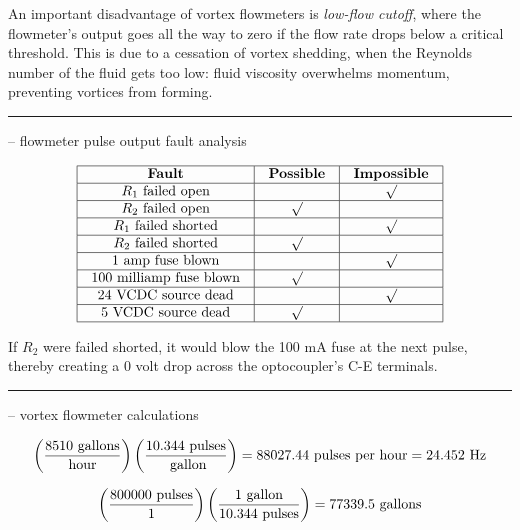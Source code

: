 \vskip 10pt

An important disadvantage of vortex flowmeters is {\it low-flow cutoff}, where the flowmeter's output goes all the way to zero if the flow rate drops below a critical threshold.  This is due to a cessation of vortex shedding, when the Reynolds number of the fluid gets too low: fluid viscosity overwhelms momentum, preventing vortices from forming.


\filbreak \vskip 5pt \hrule \vskip 5pt  -- flowmeter pulse output fault analysis \vskip 10pt


$$\vbox{\offinterlineskip
\halign{\strut
\vrule \quad\hfil # \ \hfil & 
\vrule \quad\hfil # \ \hfil & 
\vrule \quad\hfil # \ \hfil \vrule \cr
\noalign{\hrule}
%
{\bf Fault} & {\bf Possible} & {\bf Impossible} \cr
%
\noalign{\hrule}
%
$R_1$ failed open &  & $\surd$ \cr
%
\noalign{\hrule}
%
$R_2$ failed open & $\surd$ &  \cr
%
\noalign{\hrule}
%
$R_1$ failed shorted &  & $\surd$ \cr
%
\noalign{\hrule}
%
$R_2$ failed shorted & $\surd$ &  \cr
%
\noalign{\hrule}
%
1 amp fuse blown &  & $\surd$ \cr
%
\noalign{\hrule}
%
100 milliamp fuse blown & $\surd$ &  \cr
%
\noalign{\hrule}
%
24 VCDC source dead &  & $\surd$ \cr
%
\noalign{\hrule}
%
5 VCDC source dead & $\surd$ &  \cr
%
\noalign{\hrule}
} %
}$$ %

If $R_2$ were failed shorted, it would blow the 100 mA fuse at the next pulse, thereby creating a 0 volt drop across the optocoupler's C-E terminals.


\filbreak \vskip 5pt \hrule \vskip 5pt  -- vortex flowmeter calculations \vskip 10pt

$$\left({8510 \hbox{ gallons} \over \hbox{hour}} \right) \left( {10.344 \hbox{ pulses} \over \hbox{ gallon}} \right) = 88027.44 \hbox{ pulses per hour} = 24.452 \hbox{ Hz}$$

\vskip 10pt

$$\left({800000 \hbox{ pulses} \over 1} \right) \left({ 1 \hbox{ gallon} \over 10.344 \hbox{ pulses}} \right) = 77339.5 \hbox{ gallons}$$

